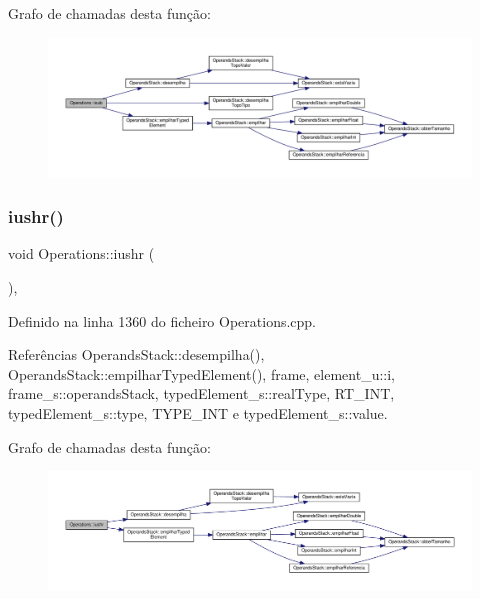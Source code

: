 Grafo de chamadas desta função\+:\nopagebreak
\begin{figure}[H]
\begin{center}
\leavevmode
\includegraphics[width=350pt]{classOperations_ab2808e99336de64fefb2a9073bc251de_cgraph}
\end{center}
\end{figure}
\mbox{\label{classOperations_ae3ab5ae36e587a47832886fdf4f8b2a6}} 
\subsubsection{\texorpdfstring{iushr()}{iushr()}}
{\footnotesize\ttfamily void Operations\+::iushr (\begin{DoxyParamCaption}{ }\end{DoxyParamCaption})\hspace{0.3cm}{\ttfamily [static]}, {\ttfamily [private]}}



Definido na linha 1360 do ficheiro Operations.\+cpp.



Referências Operands\+Stack\+::desempilha(), Operands\+Stack\+::empilhar\+Typed\+Element(), frame, element\+\_\+u\+::i, frame\+\_\+s\+::operands\+Stack, typed\+Element\+\_\+s\+::real\+Type, R\+T\+\_\+\+I\+NT, typed\+Element\+\_\+s\+::type, T\+Y\+P\+E\+\_\+\+I\+NT e typed\+Element\+\_\+s\+::value.

Grafo de chamadas desta função\+:\nopagebreak
\begin{figure}[H]
\begin{center}
\leavevmode
\includegraphics[width=350pt]{classOperations_ae3ab5ae36e587a47832886fdf4f8b2a6_cgraph}
\end{center}
\end{figure}
\mbox{\label{classOperations_abd0ce3453623b677de3af1f05bcf4b0b}} 
